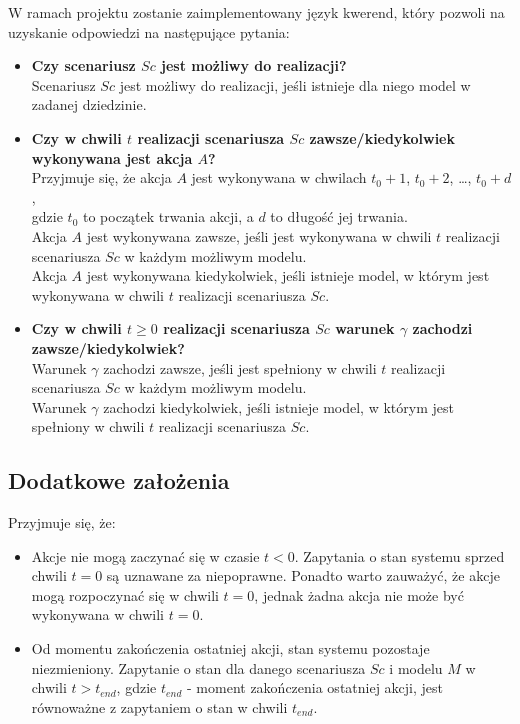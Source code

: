 \documentclass{article}
\begin{document}
W ramach projektu zostanie zaimplementowany język kwerend, który pozwoli na uzyskanie odpowiedzi na następujące pytania:
\begin{itemize}
    \item \textbf{Czy scenariusz $Sc$ jest możliwy do realizacji?}\\
    Scenariusz $Sc$ jest możliwy do realizacji, jeśli istnieje dla niego model w zadanej dziedzinie.
    \item \textbf{Czy w chwili $t$ realizacji scenariusza $Sc$ zawsze/kiedykolwiek wykonywana jest akcja $A$?}\\
    Przyjmuje się, że akcja $A$ jest wykonywana w chwilach $t_0+1$, $t_0+2$, \ldots, $t_0+d$,\\
    gdzie $t_0$ to początek trwania akcji, a $d$ to długość jej trwania.\\
    Akcja $A$ jest wykonywana zawsze, jeśli jest wykonywana w chwili $t$ realizacji scenariusza $Sc$ w każdym możliwym modelu.\\
    Akcja $A$ jest wykonywana kiedykolwiek, jeśli istnieje model, w którym jest wykonywana w chwili $t$ realizacji scenariusza $Sc$.
    \item \textbf{Czy w chwili $t \ge 0$ realizacji scenariusza $Sc$ warunek $\gamma$ zachodzi zawsze/kiedykolwiek?}\\
    Warunek $\gamma$ zachodzi zawsze, jeśli jest spełniony w chwili $t$ realizacji scenariusza $Sc$ w każdym możliwym modelu.\\
    Warunek $\gamma$ zachodzi kiedykolwiek, jeśli istnieje model, w którym jest spełniony w chwili $t$ realizacji scenariusza $Sc$.
\end{itemize}

\subsection{Dodatkowe założenia}
Przyjmuje się, że:
\begin{itemize}
    \item Akcje nie mogą zaczynać się w czasie $t < 0$. Zapytania o stan systemu sprzed chwili $t = 0$ są uznawane za niepoprawne. Ponadto warto zauważyć, że akcje mogą rozpoczynać się w chwili $t = 0$, jednak żadna akcja nie może być wykonywana w chwili $t = 0$.
    \item Od momentu zakończenia ostatniej akcji, stan systemu pozostaje niezmieniony. Zapytanie o stan dla danego scenariusza $Sc$ i modelu $M$ w chwili $t > t_{end}$, gdzie $t_{end}$ - moment zakończenia ostatniej akcji, jest równoważne z zapytaniem o stan w chwili $t_{end}$.
\end{itemize}
\end{document}
